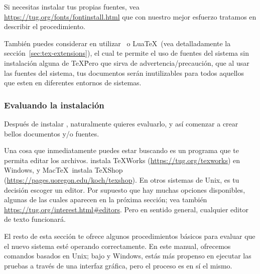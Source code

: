 \documentclass{article}
\begin{document}
Si necesitas instalar tus propias fuentes, vea
\url{https://tug.org/fonts/fontinstall.html} que con nuestro mejor esfuerzo tratamos en describir el procedimiento.
  
También puedes considerar en utilizar \XeTeX\ o Lua\TeX\ (vea detalladamente la sección~\ref{sec:tex-extensions}), el cual te permite el uso de fuentes del sistema sin instalación alguna de \TeX\. Pero que sirva de advertencia/precaución, que al usar las fuentes del sistema, tus documentos serán inutilizables para todos aquellos que esten en diferentes entornos de sistemas. 
   
\subsubsection{Evaluando la instalación}
\label{sec:test-install}

Después de instalar \TL{}, naturalmente quieres evaluarlo, y así
comenzar a crear bellos documentos y\slash o fuentes. 

Una cosa que inmediatamente puedes estar buscando es un programa que te
permita editar los archivos. \TL{} instala \TeX{}Works
(\url{https://tug.org/texworks}) en Windows, y Mac\TeX\ instala TeXShop
(\url{https://pages.uoregon.edu/koch/texshop}). En otros sistemas de
Unix, es tu decisión escoger un editor. Por supuesto que hay muchas
opciones disponibles, algunas de las cuales aparecen en la próxima
sección; vea también \url{https://tug.org/interest.html#editors}. Pero
en sentido general, cualquier editor de texto funcionará.

El resto de esta sección te ofrece algunos procedimientos básicos para
evaluar que el nuevo sistema esté operando correctamente. En este
manual, ofrecemos comandos basados en Unix; bajo \macOS{} y Windows, estás
más propenso en ejecutar las pruebas a través de una interfaz gráfica,
pero el proceso es en sí el mismo. 
\end{document}
